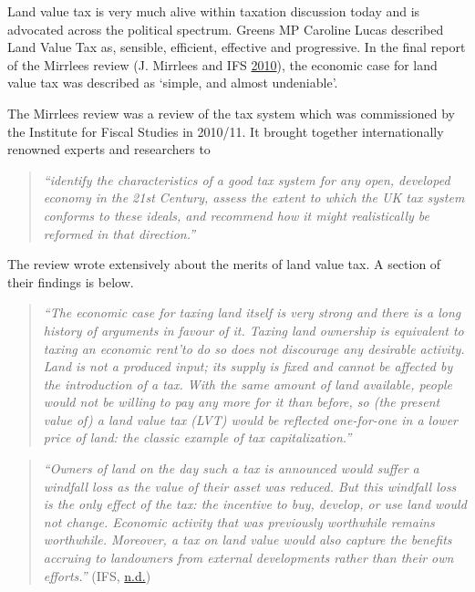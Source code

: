 \documentclass[]{tufte-handout}
\begin{document}
Land value tax is very much alive within taxation discussion today and
is advocated across the political spectrum. Greens MP Caroline Lucas
described Land Value Tax as, sensible, efficient, effective and
progressive. In the final report of the Mirrlees review (J. Mirrlees and
IFS \protect\hyperlink{ref-Mirrlees2010}{2010}), the economic case for
land value tax was described as `simple, and almost undeniable'.

The Mirrlees review was a review of the tax system which was
commissioned by the Institute for Fiscal Studies in 2010/11. It brought
together internationally renowned experts and researchers to

\begin{quote}
\emph{``identify the characteristics of a good tax system for any open,
developed economy in the 21st Century, assess the extent to which the UK
tax system conforms to these ideals, and recommend how it might
realistically be reformed in that direction.''}
\end{quote}

The review wrote extensively about the merits of land value tax. A
section of their findings is below.

\begin{quote}
\emph{``The economic case for taxing land itself is very strong and
there is a long history of arguments in favour of it. Taxing land
ownership is equivalent to taxing an economic rent'to do so does not
discourage any desirable activity. Land is not a produced input; its
supply is fixed and cannot be affected by the introduction of a tax.
With the same amount of land available, people would not be willing to
pay any more for it than before, so (the present value of) a land value
tax (LVT) would be reflected one-for-one in a lower price of land: the
classic example of tax capitalization.''}
\end{quote}

\begin{quote}
\emph{``Owners of land on the day such a tax is announced would suffer a
windfall loss as the value of their asset was reduced. But this windfall
loss is the only effect of the tax: the incentive to buy, develop, or
use land would not change. Economic activity that was previously
worthwhile remains worthwhile. Moreover, a tax on land value would also
capture the benefits accruing to landowners from external developments
rather than their own efforts.''} (IFS,
\protect\hyperlink{ref-IFS}{n.d.})
\end{quote}
\end{document}

